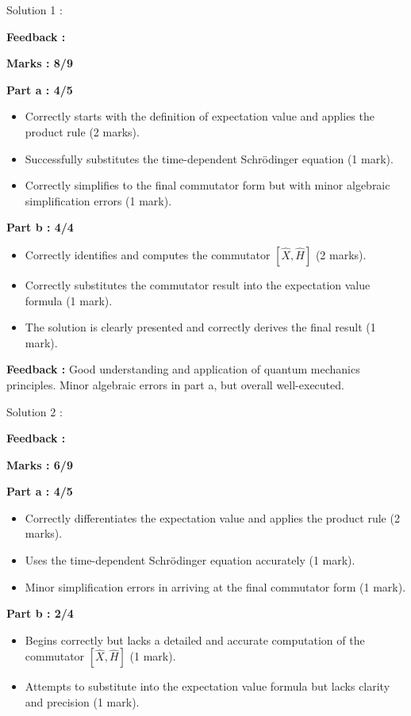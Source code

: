 \documentclass[a4paper,11pt]{article}
\begin{document}
Solution 1 :

\textbf{Feedback :}

\textbf{Marks : 8/9}

\textbf{Part a : 4/5}

\begin{itemize}
    \item Correctly starts with the definition of expectation value and applies the product rule (2 marks).
    \item Successfully substitutes the time-dependent Schrödinger equation (1 mark).
    \item Correctly simplifies to the final commutator form but with minor algebraic simplification errors (1 mark).
\end{itemize}


\textbf{Part b : 4/4}

\begin{itemize}
    \item Correctly identifies and computes the commutator $[\hat{X}, \hat{H}]$ (2 marks).
    \item Correctly substitutes the commutator result into the expectation value formula (1 mark).
    \item The solution is clearly presented and correctly derives the final result (1 mark).
\end{itemize}

\textbf{Feedback :}
Good understanding and application of quantum mechanics principles. Minor algebraic errors in part a, but overall well-executed.



Solution 2 :

\textbf{Feedback :}

\textbf{Marks : 6/9}

\textbf{Part a : 4/5}

\begin{itemize}
    \item Correctly differentiates the expectation value and applies the product rule (2 marks).
    \item Uses the time-dependent Schrödinger equation accurately (1 mark).
    \item Minor simplification errors in arriving at the final commutator form (1 mark).
\end{itemize}


\textbf{Part b : 2/4}

\begin{itemize}
    \item Begins correctly but lacks a detailed and accurate computation of the commutator $[\hat{X}, \hat{H}]$ (1 mark).
    \item Attempts to substitute into the expectation value formula but lacks clarity and precision (1 mark).
\end{itemize}
\end{document}
